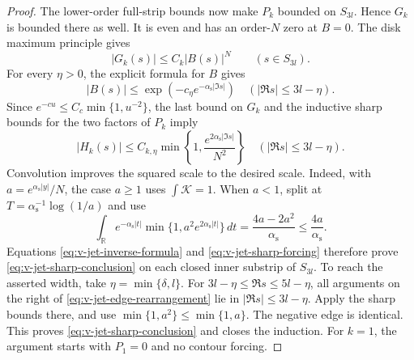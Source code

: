 \begin{proof}
The lower-order full-strip bounds now make $P_k$ bounded on
$S_{3 l}$.  Hence $G_k$ is bounded there as well.  It is even and
has an order-$N$ zero at $B=0$.  The disk maximum principle gives
\[
 |G_k(s)|\le C_k|B(s)|^N\qquad(s\in S_{3 l}).
\]
For every $\eta>0$, the explicit formula for $B$ gives
\[
 |B(s)|\le\exp(-c_\eta e^{-\alpha_{\mathrm s}|\Im s|})
       \quad(|\Re s|\le3 l-\eta).
\]
Since $e^{-cu}\le C_c\min\{1,u^{-2}\}$, the last bound on $G_k$
and the inductive sharp bounds for the two factors of $P_k$ imply
\begin{equation}\label{eq:v-jet-sharp-forcing}
 |H_k(s)|\le C_{k,\eta}
       \min\left\{1,\frac{e^{2\alpha_{\mathrm s}|\Im s|}}{N^2}\right\}
       \quad(|\Re s|\le3 l-\eta).
\end{equation}
Convolution improves the squared scale to the desired scale.  Indeed,
with $a=e^{\alpha_{\mathrm s}|y|}/N$, the case $a\ge1$ uses
$\int\mathcal K=1$.  When $a<1$, split at
$T=\alpha_{\mathrm s}^{-1}\log(1/a)$ and use
\[
 \int_{\mathbb R}e^{-\alpha_{\mathrm s}|t|}
       \min\{1,a^2e^{2\alpha_{\mathrm s}|t|}\}\,dt
       =\frac{4a-2a^2}{\alpha_{\mathrm s}}
       \le\frac{4a}{\alpha_{\mathrm s}}.
\]
Equations \eqref{eq:v-jet-inverse-formula} and
\eqref{eq:v-jet-sharp-forcing} therefore prove
\eqref{eq:v-jet-sharp-conclusion} on each closed inner substrip of
$S_{3 l}$.  To reach the asserted width, take
$\eta=\min\{\delta, l\}$.  For
$3 l-\eta\le\Re s\le5 l-\eta$, all arguments on the right
of \eqref{eq:v-jet-edge-rearrangement} lie in
$|\Re s|\le3 l-\eta$.  Apply the sharp bounds there, and use
$\min\{1,a^2\}\le\min\{1,a\}$.  The negative edge is identical.
This proves \eqref{eq:v-jet-sharp-conclusion} and closes the induction.
For $k=1$, the argument starts with $P_1=0$ and no contour forcing.


\end{proof}
